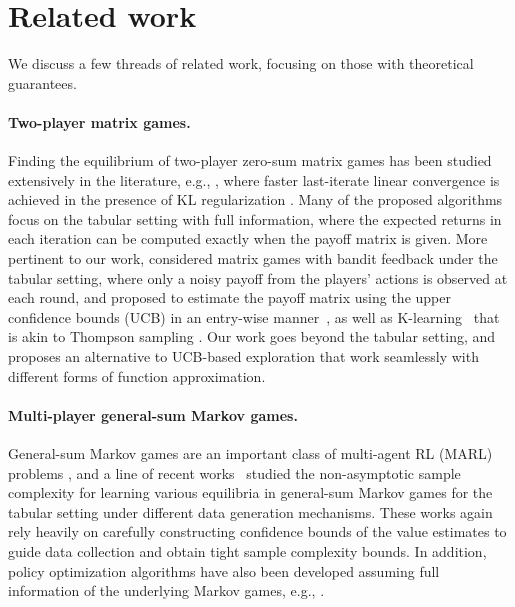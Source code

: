 \section{Related work}
\label{sec:related}


We  discuss a few threads of related work, focusing on those with theoretical guarantees. 
 

\paragraph{Two-player matrix games.} Finding the equilibrium of two-player zero-sum matrix games has been studied extensively in the literature, e.g., \citet{mertikopoulos2018cycles,shapley1953stochastic,daskalakis2018last,wei2020linear}, where faster last-iterate linear convergence is achieved in the presence of KL regularization \citep{cen2021fast,zhan2023policy}. Many of the proposed algorithms focus on the tabular setting with full information, where the expected returns in each iteration can be computed exactly when the payoff matrix is given. More pertinent to our work, \citet{o2021matrix} considered matrix games with bandit feedback under the tabular setting, where only a noisy payoff from the players' actions is observed at each round, and proposed to estimate the payoff matrix using the upper confidence bounds (UCB) in an entry-wise manner~\citep{lai1987adaptive,bouneffouf2016finite}, as well as K-learning~\citep{o2021variational} that is akin to Thompson sampling \citep{russo2018tutorial}. Our work goes beyond the tabular setting, and proposes an alternative to UCB-based exploration that work seamlessly with different forms of function approximation.

 

\paragraph{Multi-player general-sum Markov games.} General-sum Markov games are an important class of multi-agent RL (MARL) problems \citep{littman1994markov}, and a line of recent works~\citep{liu2021sharp,bai2021sample,mao2023provably,song2021can,jin2021v,li2022minimax,sessa2022efficient} studied the non-asymptotic sample complexity for learning various equilibria in general-sum Markov games for the tabular setting under different data generation mechanisms. These works again rely heavily on carefully constructing confidence bounds of  the value estimates to guide data collection and obtain tight sample complexity bounds. In addition, policy optimization algorithms have also been developed assuming full information of the underlying Markov games, e.g., \citet{erez2023regret,zhang2022policy,cen2023faster}. 



